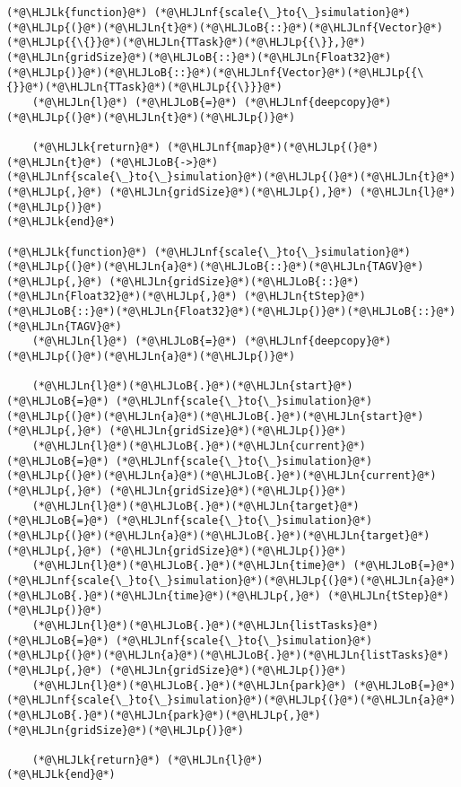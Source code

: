 \documentclass[12pt,a4paper]{article}
\newcommand{\HLJLk}[1]{\textcolor[RGB]{148,91,176}{\textbf{#1}}}
\newcommand{\HLJLn}[1]{#1}
\newcommand{\HLJLnf}[1]{\textcolor[RGB]{66,102,213}{#1}}
\newcommand{\HLJLoB}[1]{\textcolor[RGB]{102,102,102}{\textbf{#1}}}
\newcommand{\HLJLp}[1]{#1}
\begin{document}
\begin{lstlisting}
(*@\HLJLk{function}@*) (*@\HLJLnf{scale{\_}to{\_}simulation}@*)(*@\HLJLp{(}@*)(*@\HLJLn{t}@*)(*@\HLJLoB{::}@*)(*@\HLJLnf{Vector}@*)(*@\HLJLp{{\{}}@*)(*@\HLJLn{TTask}@*)(*@\HLJLp{{\}},}@*) (*@\HLJLn{gridSize}@*)(*@\HLJLoB{::}@*)(*@\HLJLn{Float32}@*)(*@\HLJLp{)}@*)(*@\HLJLoB{::}@*)(*@\HLJLnf{Vector}@*)(*@\HLJLp{{\{}}@*)(*@\HLJLn{TTask}@*)(*@\HLJLp{{\}}}@*)
    (*@\HLJLn{l}@*) (*@\HLJLoB{=}@*) (*@\HLJLnf{deepcopy}@*)(*@\HLJLp{(}@*)(*@\HLJLn{t}@*)(*@\HLJLp{)}@*)

    (*@\HLJLk{return}@*) (*@\HLJLnf{map}@*)(*@\HLJLp{(}@*)(*@\HLJLn{t}@*) (*@\HLJLoB{->}@*) (*@\HLJLnf{scale{\_}to{\_}simulation}@*)(*@\HLJLp{(}@*)(*@\HLJLn{t}@*)(*@\HLJLp{,}@*) (*@\HLJLn{gridSize}@*)(*@\HLJLp{),}@*) (*@\HLJLn{l}@*)(*@\HLJLp{)}@*)
(*@\HLJLk{end}@*)

(*@\HLJLk{function}@*) (*@\HLJLnf{scale{\_}to{\_}simulation}@*)(*@\HLJLp{(}@*)(*@\HLJLn{a}@*)(*@\HLJLoB{::}@*)(*@\HLJLn{TAGV}@*)(*@\HLJLp{,}@*) (*@\HLJLn{gridSize}@*)(*@\HLJLoB{::}@*)(*@\HLJLn{Float32}@*)(*@\HLJLp{,}@*) (*@\HLJLn{tStep}@*)(*@\HLJLoB{::}@*)(*@\HLJLn{Float32}@*)(*@\HLJLp{)}@*)(*@\HLJLoB{::}@*)(*@\HLJLn{TAGV}@*)
    (*@\HLJLn{l}@*) (*@\HLJLoB{=}@*) (*@\HLJLnf{deepcopy}@*)(*@\HLJLp{(}@*)(*@\HLJLn{a}@*)(*@\HLJLp{)}@*)

    (*@\HLJLn{l}@*)(*@\HLJLoB{.}@*)(*@\HLJLn{start}@*) (*@\HLJLoB{=}@*) (*@\HLJLnf{scale{\_}to{\_}simulation}@*)(*@\HLJLp{(}@*)(*@\HLJLn{a}@*)(*@\HLJLoB{.}@*)(*@\HLJLn{start}@*)(*@\HLJLp{,}@*) (*@\HLJLn{gridSize}@*)(*@\HLJLp{)}@*)
    (*@\HLJLn{l}@*)(*@\HLJLoB{.}@*)(*@\HLJLn{current}@*) (*@\HLJLoB{=}@*) (*@\HLJLnf{scale{\_}to{\_}simulation}@*)(*@\HLJLp{(}@*)(*@\HLJLn{a}@*)(*@\HLJLoB{.}@*)(*@\HLJLn{current}@*)(*@\HLJLp{,}@*) (*@\HLJLn{gridSize}@*)(*@\HLJLp{)}@*)
    (*@\HLJLn{l}@*)(*@\HLJLoB{.}@*)(*@\HLJLn{target}@*) (*@\HLJLoB{=}@*) (*@\HLJLnf{scale{\_}to{\_}simulation}@*)(*@\HLJLp{(}@*)(*@\HLJLn{a}@*)(*@\HLJLoB{.}@*)(*@\HLJLn{target}@*)(*@\HLJLp{,}@*) (*@\HLJLn{gridSize}@*)(*@\HLJLp{)}@*)
    (*@\HLJLn{l}@*)(*@\HLJLoB{.}@*)(*@\HLJLn{time}@*) (*@\HLJLoB{=}@*) (*@\HLJLnf{scale{\_}to{\_}simulation}@*)(*@\HLJLp{(}@*)(*@\HLJLn{a}@*)(*@\HLJLoB{.}@*)(*@\HLJLn{time}@*)(*@\HLJLp{,}@*) (*@\HLJLn{tStep}@*)(*@\HLJLp{)}@*)
    (*@\HLJLn{l}@*)(*@\HLJLoB{.}@*)(*@\HLJLn{listTasks}@*) (*@\HLJLoB{=}@*) (*@\HLJLnf{scale{\_}to{\_}simulation}@*)(*@\HLJLp{(}@*)(*@\HLJLn{a}@*)(*@\HLJLoB{.}@*)(*@\HLJLn{listTasks}@*)(*@\HLJLp{,}@*) (*@\HLJLn{gridSize}@*)(*@\HLJLp{)}@*)
    (*@\HLJLn{l}@*)(*@\HLJLoB{.}@*)(*@\HLJLn{park}@*) (*@\HLJLoB{=}@*) (*@\HLJLnf{scale{\_}to{\_}simulation}@*)(*@\HLJLp{(}@*)(*@\HLJLn{a}@*)(*@\HLJLoB{.}@*)(*@\HLJLn{park}@*)(*@\HLJLp{,}@*) (*@\HLJLn{gridSize}@*)(*@\HLJLp{)}@*)

    (*@\HLJLk{return}@*) (*@\HLJLn{l}@*)
(*@\HLJLk{end}@*)
\end{lstlisting}
\end{document}
